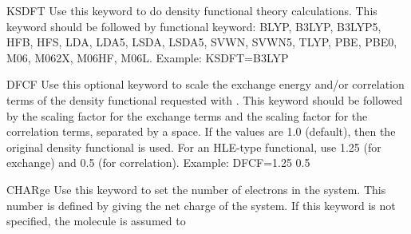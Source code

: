 \begin{keywordlist}
\item[KSDFT]
Use this keyword to do density functional theory calculations.
This keyword should be followed by functional keyword:
BLYP, B3LYP, B3LYP5, HFB, HFS, LDA, LDA5, LSDA, LSDA5, SVWN, SVWN5, TLYP, PBE, PBE0, M06, M062X, M06HF, M06L.
Example: KSDFT=B3LYP
\item[DFCF]
Use this optional keyword to scale the exchange energy and/or correlation terms of the density functional requested with .
This keyword should be followed by the scaling factor for the exchange terms and the scaling factor for the correlation terms, separated by a space.
If the values are 1.0 (default), then the original density functional is used.
For an HLE-type functional, use 1.25 (for exchange) and 0.5 (for correlation).
Example: DFCF=1.25 0.5
\item[CHARge]
Use this keyword to set the number of electrons in the system.
This number is defined by giving the net charge of the system.
If this keyword is not specified, the molecule is assumed to

\end{keywordlist}
